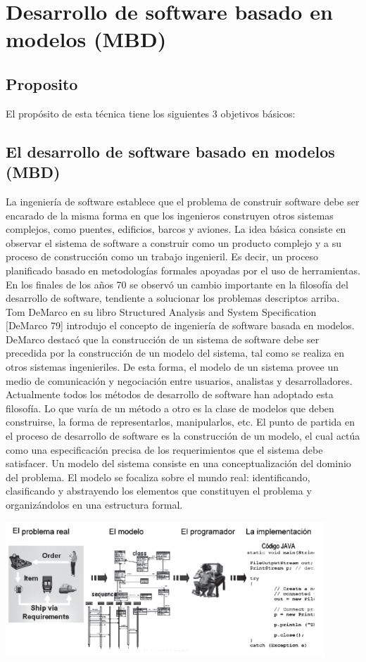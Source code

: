\section{Desarrollo de software basado en modelos (MBD)} 

\subsection{Proposito}
El propósito de esta técnica tiene los siguientes 3 objetivos básicos:

\subsection{El desarrollo de software basado en modelos (MBD)}
La ingeniería de software establece que el problema de construir software debe ser encarado de la misma forma en que los ingenieros construyen otros sistemas complejos, como puentes, edificios, barcos y aviones. La idea básica consiste en observar el sistema de software a construir como un producto complejo y a su proceso de construcción como un trabajo ingenieril. Es decir, un proceso planificado basado en metodologías formales apoyadas por el uso de herramientas. 
En los finales de los años 70 se observó un cambio importante en la filosofía del desarrollo de software, tendiente a solucionar los problemas descriptos arriba. Tom DeMarco en su libro Structured Analysis and System Specification [DeMarco 79] introdujo el concepto de ingeniería de software basada en modelos. DeMarco destacó que la construcción de un sistema de software debe ser precedida por la construcción de un modelo del sistema, tal como se realiza en otros sistemas ingenieriles. De esta forma, el modelo de un sistema provee un medio de comunicación y negociación entre usuarios, analistas y desarrolladores. Actualmente todos los métodos de desarrollo de software han adoptado esta filosofía. Lo que varía de un método a otro es la clase de modelos que deben construirse, la forma de representarlos, manipularlos, etc. El punto de partida en el proceso de desarrollo de software es la construcción de un modelo, el cual actúa como una especificación precisa de los requerimientos que el sistema debe satisfacer.  Un modelo del sistema consiste en una conceptualización del dominio del problema. El modelo  se focaliza sobre el mundo real: identificando, clasificando y abstrayendo los elementos que constituyen el problema y organizándolos en una estructura formal. 

\begin{center}
    \includegraphics[width=12cm]{./Imagenes/mdd1}
    \end{center}

